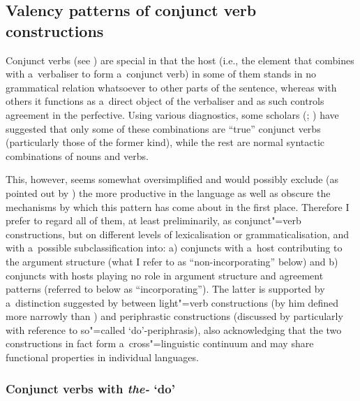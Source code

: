 \subsection{Valency patterns of conjunct verb constructions}
\label{subsec:12-2-8}

Conjunct verbs (see ) are special in that the host (i.e., the element that combines with a~verbaliser to form a~conjunct verb) in some of them stands in no grammatical relation whatsoever to other parts of the sentence, whereas with others it functions as a~direct object of the verbaliser and as such controls agreement in the perfective. Using various diagnostics, some scholars (\citealt[201]{verma1993}; \citealt[165]{mohanan1993}) have suggested that only some of these combinations are ``true'' conjunct verbs (particularly those of the former kind), while the rest are normal syntactic combinations of nouns and verbs. 



This, however, seems somewhat oversimplified and would possibly exclude (as pointed out by \citealt[160]{masica1993}) the more productive in the language as well as obscure the mechanisms by which this pattern has come about in the first place. Therefore I prefer to regard all of them, at least preliminarily, as conjunct"=verb constructions, but on different levels of lexicalisation or grammaticalisation, and with a~possible subclassification into: a) conjuncts with a~host contributing to the argument structure (what I refer to as ``non-incorporating'' below) and b) conjuncts with hosts playing no role in argument structure and agreement patterns (referred to below as ``incorporating''). The latter is supported by a~distinction suggested by \citet[69--74]{jaeger2006} between light"=verb constructions (by him defined more narrowly than \citealt{butt2010}) and periphrastic constructions (discussed by \citeauthor{jaeger2006} particularly with reference to so"=called `do'-periphrasis), also acknowledging that the two constructions in fact form a~cross"=linguistic continuum and may share functional properties in individual languages. 



\subsubsection*{Conjunct verbs with \textit{the-} `do'}

